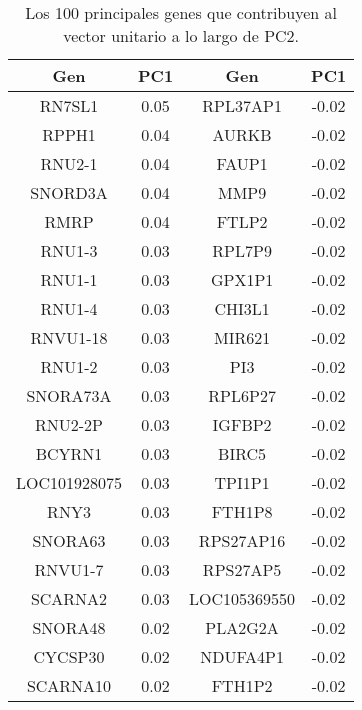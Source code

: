 
\chapter{}\label{apx:apx5}

	
	\begin{longtable}{|c|c||c|c|}
		\caption{Los 100 principales genes que contribuyen al vector unitario a lo largo de PC2.\label{tab:apx5}}\\
		
		\hline
		Gen & PC1 & Gen & PC1 \\ \hline
		\endhead
		
		RN7SL1 & 0.05 & RPL37AP1 & -0.02 \\
		\hline
		RPPH1 & 0.04 & AURKB & -0.02 \\
		\hline
		RNU2-1 & 0.04 & FAUP1 & -0.02 \\
		\hline
		SNORD3A & 0.04 & MMP9 & -0.02 \\
		\hline
		RMRP & 0.04 & FTLP2 & -0.02 \\
		\hline
		RNU1-3 & 0.03 & RPL7P9 & -0.02 \\
		\hline
		RNU1-1 & 0.03 & GPX1P1 & -0.02 \\
		\hline
		RNU1-4 & 0.03 & CHI3L1 & -0.02 \\
		\hline
		RNVU1-18 & 0.03 & MIR621 & -0.02 \\
		\hline
		RNU1-2 & 0.03 & PI3 & -0.02 \\
		\hline
		SNORA73A & 0.03 & RPL6P27 & -0.02 \\
		\hline
		RNU2-2P & 0.03 & IGFBP2 & -0.02 \\
		\hline
		BCYRN1 & 0.03 & BIRC5 & -0.02 \\
		\hline
		LOC101928075 & 0.03 & TPI1P1 & -0.02 \\
		\hline
		RNY3 & 0.03 & FTH1P8 & -0.02 \\
		\hline
		SNORA63 & 0.03 & RPS27AP16 & -0.02 \\
		\hline
		RNVU1-7 & 0.03 & RPS27AP5 & -0.02 \\
		\hline
		SCARNA2 & 0.03 & LOC105369550 & -0.02 \\
		\hline
		SNORA48 & 0.02 & PLA2G2A & -0.02 \\
		\hline
		CYCSP30 & 0.02 & NDUFA4P1 & -0.02 \\
		\hline
		SCARNA10 & 0.02 & FTH1P2 & -0.02 \\

\end{longtable}
